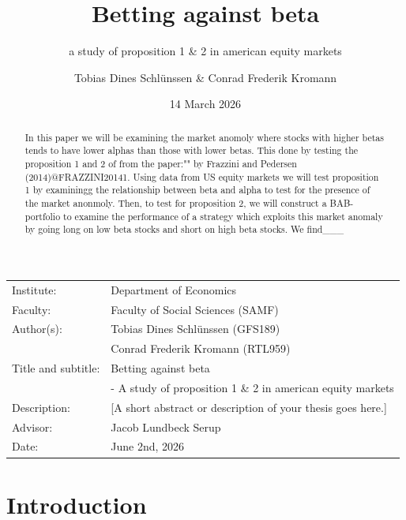 \documentclass[
  english,
  12pt,
  11pt,
  a4paper,
  openany]{memoir}
\title{Betting against beta}
\subtitle{a study of proposition 1 \& 2 in american equity markets}
\author{Tobias Dines Schlünssen \& Conrad Frederik Kromann}
\date{14 March 2026}
\let\frontmatter\relax
\let\mainmatter\relax
\renewcommand*\contentsname{Table of contents}
\newcommand\contentsname{Table of contents}
\begin{document}
\frontmatter
\maketitle


\mainmatter

\thispagestyle{empty}
\vspace*{2cm}
\begin{tabular}{@{}p{3.5cm} p{9cm}}
  Institute:          & Department of Economics \\[1ex]
  Faculty:            & Faculty of Social Sciences (SAMF) \\[1ex]
  Author(s):          & Tobias Dines Schlünssen (GFS189)\\
                        & Conrad Frederik Kromann (RTL959)\\[1ex]
  Title and subtitle: & Betting against beta\\
                        &- A study of proposition 1 \& 2 in american equity markets \\[1ex]
  Description:        & [A short abstract or description of your thesis goes here.] \\[1ex]
  Advisor:            & Jacob Lundbeck Serup\\[1ex]
  Date:               & June 2nd, 2026 \\
\end{tabular}
\clearpage
\begin{abstract}
In this paper we will be examining the market anomoly where stocks with higher betas tends to have lower alphas than those with lower betas. This done by testing the proposition 1 and 2 of from the paper:"" by Frazzini and Pedersen (2014)@FRAZZINI20141. Using data from US equity markets we will test proposition 1 by examiningg the relationship between beta and alpha to test for the presence of the market anonmoly. Then, to test for proposition 2, we will construct a BAB-portfolio to examine the performance of a strategy which exploits this market anomaly by going long on low beta stocks and short on high beta stocks. We find___ 
\end{abstract}

\clearpage

\renewcommand{\contentsname}{Table of content}
\tableofcontents
\clearpage

\chapter{Introduction}\label{introduction}
\end{document}
